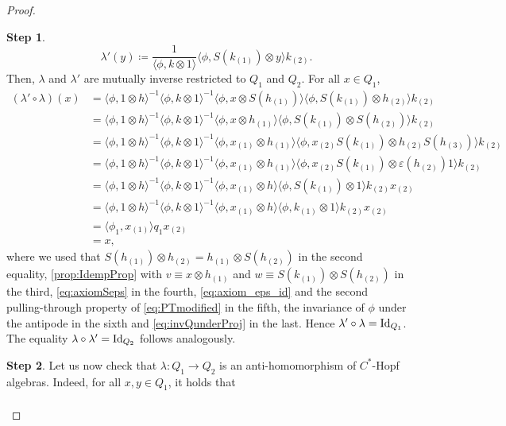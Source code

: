\documentclass[a4paper,10pt]{amsart}
\newcommand{\eval}[2]{\langle #1 , #2\rangle}
\theoremstyle{definition}
\newtheorem{step-goursat}{Step}
\begin{document}
\begin{proof}
\begin{step-goursat}
\begin{equation}
        \lambda'(y) \coloneqq
            \frac{1}{\eval{\phi}{k \otimes 1}}\eval{\phi}{S(k_{(1)}) \otimes y} k_{(2)}.
    \end{equation}
    Then, $\lambda$ and $\lambda'$ are mutually inverse restricted to $Q_1$ and $Q_2$.
    For all $x\in Q_1$, 
    \begin{align*}
        (\lambda' \circ \lambda)(x)
        &= \eval{\phi}{1\otimes h}^{-1}\eval{\phi}{k\otimes 1}^{-1}\eval{\phi}{x \otimes S(h_{(1)})} \eval{\phi}{S(k_{(1)}) \otimes h_{(2)}} k_{(2)}\\
        &= \eval{\phi}{1\otimes h}^{-1}\eval{\phi}{k\otimes 1}^{-1}\eval{\phi}{x \otimes h_{(1)}} \eval{\phi}{S(k_{(1)}) \otimes S(h_{(2)})} k_{(2)}\\
        &= \eval{\phi}{1\otimes h}^{-1}\eval{\phi}{k\otimes 1}^{-1}\eval{\phi}{x_{(1)} \otimes h_{(1)}} \eval{\phi}{x_{(2)}S(k_{(1)}) \otimes h_{(2)} S(h_{(3)})} k_{(2)}\\
        &= \eval{\phi}{1\otimes h}^{-1}\eval{\phi}{k\otimes 1}^{-1}\eval{\phi}{x_{(1)} \otimes h_{(1)}} \eval{\phi}{x_{(2)}S(k_{(1)}) \otimes \varepsilon(h_{(2)}) 1} k_{(2)}\\
        &= \eval{\phi}{1\otimes h}^{-1}\eval{\phi}{k\otimes 1}^{-1}\eval{\phi}{x_{(1)} \otimes h} \eval{\phi}{S(k_{(1)}) \otimes 1} k_{(2)}x_{(2)}\\
        &= \eval{\phi}{1\otimes h}^{-1}\eval{\phi}{k\otimes 1}^{-1}\eval{\phi}{x_{(1)} \otimes h} \eval{\phi}{k_{(1)} \otimes 1} k_{(2)}x_{(2)}\\
        &= \eval{\phi_1}{x_{(1)}} q_1 x_{(2)}\\
        &= x,
    \end{align*}
    where we used that $S(h_{(1)})\otimes h_{(2)}= h_{(1)}\otimes S(h_{(2)})$ in the second equality, \cref{prop:IdempProp} with $v\equiv x\otimes h_{(1)}$ and $w\equiv S(k_{(1)}) \otimes S(h_{(2)})$ in the third, \cref{eq:axiomSeps} in the fourth, \cref{eq:axiom_eps_id} and the second pulling-through property of \cref{eq:PTmodified} in the fifth, the invariance of $\phi$ under the antipode in the sixth and \cref{eq:invQunderProj} in the last. Hence $\lambda'\circ\lambda=\mathrm{Id}_{\smash{Q_1}}$. The equality $\lambda\circ\lambda'=\mathrm{Id}_{\smash{Q_2}}$ follows analogously.
    \end{step-goursat}
    \begin{step-goursat}
    Let us now check that $\lambda : Q_1 \to Q_2$ is an anti-homomorphism of $C^*$-Hopf algebras. Indeed, for all $x,y\in Q_1$, it holds that
    \begin{align*}

\end{align*}
\end{step-goursat}
\end{proof}
\end{document}
